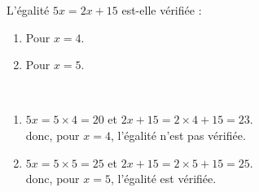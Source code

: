 \begin{exercice*} %
   L'égalité $5x =2x+15$ est-elle vérifiée :
   \begin{enumerate}
      \item Pour $x =4$.
      \item Pour $x =5$.
   \end{enumerate}
\end{exercice*}

\begin{corrige}
   \ \\ [-5mm]
   \begin{enumerate}
      \item $5x =5\times4 =20$ et $2x+15 =2\times4+15 =23$. \\
       donc, pour $x =4$, {\red l'égalité n'est pas vérifiée}.
      \item $5x =5\times5 =25$ et $2x+15=2\times5+15 =25$. \\
       donc, pour $x =5$, {\red l'égalité est vérifiée.}
   \end{enumerate}
\end{corrige}
